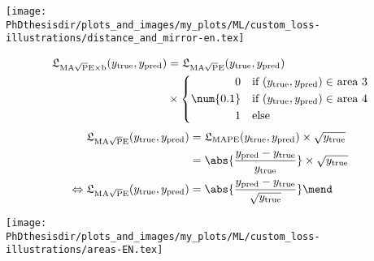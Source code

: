 \begin{frame}
\begin{minipage}[c]{.475\textwidth}
\begin{center}\vspace{-4pt}
\end{center}
\end{minipage}
\hfill
\begin{minipage}[c]{.475\textwidth}
\begin{center}\vspace{-4pt}
\texttt{[image: \\PhDthesisdir/plots\_and\_images/my\_plots/ML/custom\_loss-illustrations/distance\_and\_mirror-en.tex]}
\end{center}\vspace{-5pt}
\end{minipage}
\end{frame}


\begin{frame}

\begin{minipage}[c]{.51\textwidth}
\begin{align*}
\LossMAPEsqrtb(\ytrue, \ypred)
&=
\LossMAPEsqrt(\ytrue, \ypred)
\\&
\times
\left\lbrace
\begin{aligned}
0 \quad & \text{if $(\ytrue, \ypred)\in$ area 3}\\
\num{0.1} \quad & \text{if $(\ytrue, \ypred)\in$ area 4}\\
1 \quad & \text{else}
\end{aligned}
\right.
\end{align*}
\begin{align*}
\LossMAPEsqrt(\ytrue, \ypred)
&=
\LossMAPE(\ytrue, \ypred) \times \sqrt{\ytrue}
\\&=
\abs{\frac{\ypred-\ytrue}{\ytrue}} \times \sqrt{\ytrue}
\nonumber\\\Leftrightarrow
\LossMAPEsqrt(\ytrue, \ypred)
&=
\abs{\frac{\ypred-\ytrue}{\sqrt{\ytrue}}}
\mend
\end{align*}
\end{minipage}
\hfill
\begin{minipage}[c]{.475\textwidth}
\begin{center}\vspace{-4pt}
\texttt{[image: \\PhDthesisdir/plots\_and\_images/my\_plots/ML/custom\_loss-illustrations/areas-EN.tex]}
\end{center}\vspace{-5pt}
\end{minipage}

\end{frame}
